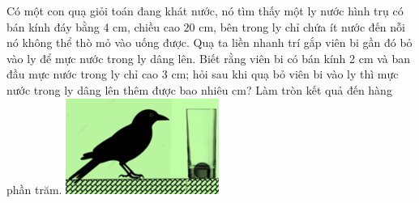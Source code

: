 \begin{ex}%
\immini
{
    Có một con quạ giỏi toán đang khát nước, nó tìm thấy một ly nước hình trụ có bán kính đáy bằng 4 cm, chiều cao $20$ cm, bên trong ly chỉ chứa ít nước đến nỗi nó không thể thò mỏ vào uống được. Quạ ta liền nhanh trí gắp viên bi gần đó bỏ vào ly để mực nước trong ly dâng lên. Biết rằng viên bi có bán kính 2 cm và ban đầu mực nước trong ly chỉ cao 3 cm; hỏi sau khi quạ bỏ viên bi vào ly thì mực nước trong ly dâng lên thêm được bao nhiêu cm? Làm tròn kết quả đến hàng phần trăm.
}
{
    \includegraphics[width=5cm]{img/HXN-10-19}
}
\end{ex}


